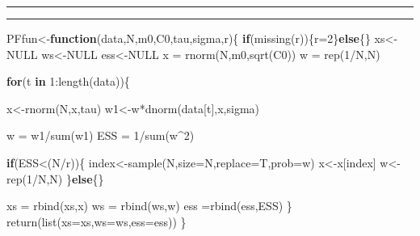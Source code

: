\documentclass[
]{book}
\newenvironment{Shaded}{\begin{snugshade}}{\end{snugshade}}
\newcommand{\AttributeTok}[1]{\textcolor[rgb]{0.77,0.63,0.00}{#1}}
\newcommand{\ConstantTok}[1]{\textcolor[rgb]{0.00,0.00,0.00}{#1}}
\newcommand{\ControlFlowTok}[1]{\textcolor[rgb]{0.13,0.29,0.53}{\textbf{#1}}}
\newcommand{\DecValTok}[1]{\textcolor[rgb]{0.00,0.00,0.81}{#1}}
\newcommand{\FunctionTok}[1]{\textcolor[rgb]{0.00,0.00,0.00}{#1}}
\newcommand{\NormalTok}[1]{#1}
\newcommand{\OtherTok}[1]{\textcolor[rgb]{0.56,0.35,0.01}{#1}}
\newcommand{\SpecialCharTok}[1]{\textcolor[rgb]{0.00,0.00,0.00}{#1}}
\theoremstyle{break}
\theoremstyle{nonumberplain}
\begin{document}
\hrule
\hrule

\begin{Shaded}
\begin{Highlighting}[]
\NormalTok{PFfun}\OtherTok{\textless{}{-}}\ControlFlowTok{function}\NormalTok{(data,N,m0,C0,tau,sigma,r)\{}
  \ControlFlowTok{if}\NormalTok{(}\FunctionTok{missing}\NormalTok{(r))\{r}\OtherTok{=}\DecValTok{2}\NormalTok{\}}\ControlFlowTok{else}\NormalTok{\{\}}
\NormalTok{  xs}\OtherTok{\textless{}{-}}\ConstantTok{NULL}
\NormalTok{  ws}\OtherTok{\textless{}{-}}\ConstantTok{NULL}
\NormalTok{  ess}\OtherTok{\textless{}{-}}\ConstantTok{NULL}
\NormalTok{  x  }\OtherTok{=} \FunctionTok{rnorm}\NormalTok{(N,m0,}\FunctionTok{sqrt}\NormalTok{(C0))}
\NormalTok{  w  }\OtherTok{=} \FunctionTok{rep}\NormalTok{(}\DecValTok{1}\SpecialCharTok{/}\NormalTok{N,N)}
   
  \ControlFlowTok{for}\NormalTok{(t }\ControlFlowTok{in} \DecValTok{1}\SpecialCharTok{:}\FunctionTok{length}\NormalTok{(data))\{}
    
\NormalTok{    x}\OtherTok{\textless{}{-}}\FunctionTok{rnorm}\NormalTok{(N,x,tau)}
\NormalTok{    w1}\OtherTok{\textless{}{-}}\NormalTok{w}\SpecialCharTok{*}\FunctionTok{dnorm}\NormalTok{(data[t],x,sigma)}
    
\NormalTok{    w }\OtherTok{=}\NormalTok{ w1}\SpecialCharTok{/}\FunctionTok{sum}\NormalTok{(w1)}
\NormalTok{    ESS  }\OtherTok{=} \DecValTok{1}\SpecialCharTok{/}\FunctionTok{sum}\NormalTok{(w}\SpecialCharTok{\^{}}\DecValTok{2}\NormalTok{)}
    
    \ControlFlowTok{if}\NormalTok{(ESS}\SpecialCharTok{\textless{}}\NormalTok{(N}\SpecialCharTok{/}\NormalTok{r))\{}
\NormalTok{      index}\OtherTok{\textless{}{-}}\FunctionTok{sample}\NormalTok{(N,}\AttributeTok{size=}\NormalTok{N,}\AttributeTok{replace=}\NormalTok{T,}\AttributeTok{prob=}\NormalTok{w)}
\NormalTok{      x}\OtherTok{\textless{}{-}}\NormalTok{x[index]}
\NormalTok{      w}\OtherTok{\textless{}{-}}\FunctionTok{rep}\NormalTok{(}\DecValTok{1}\SpecialCharTok{/}\NormalTok{N,N)}
\NormalTok{    \}}\ControlFlowTok{else}\NormalTok{\{\}}
    
\NormalTok{    xs }\OtherTok{=} \FunctionTok{rbind}\NormalTok{(xs,x)}
\NormalTok{    ws }\OtherTok{=} \FunctionTok{rbind}\NormalTok{(ws,w)}
\NormalTok{    ess }\OtherTok{=}\FunctionTok{rbind}\NormalTok{(ess,ESS)}
\NormalTok{  \}}
  \FunctionTok{return}\NormalTok{(}\FunctionTok{list}\NormalTok{(}\AttributeTok{xs=}\NormalTok{xs,}\AttributeTok{ws=}\NormalTok{ws,}\AttributeTok{ess=}\NormalTok{ess))}
\NormalTok{\}}
\end{Highlighting}
\end{Shaded}
\end{document}
